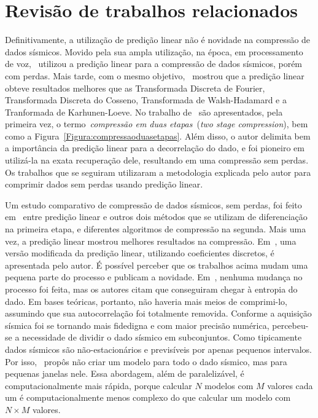 \section{Revisão de trabalhos relacionados}
\label{Sec:trabalhosrelacionados}

Definitivamente, a utilização de predição linear não é novidade na compressão de
dados sísmicos. Movido pela sua ampla utilização, na época, em
processamento de voz,~\citep{Artigo:bordley1983} utilizou a predição linear para a compressão de
dados sísmicos, porém com perdas. Mais tarde, com o
mesmo objetivo,~\citep{Artigo:linearmelhor} mostrou que a predição linear
obteve resultados melhores que as Transformada Discreta de Fourier, Transformada Discreta do Cosseno, Transformada de Walsh-Hadamard e a Tranformada
de Karhunen-Loeve. No trabalho de~\citep{Artigo:stearnsincompleto} são
apresentados, pela primeira vez, o termo~\emph{compressão em duas
etapas}~(\emph{two stage compression}), bem como a
Figura~\ref{Figura:compressaoduasetapas}. Além disso, o autor delimita bem a
importância da predição linear para a decorrelação do dado, e foi pioneiro em
utilizá-la na exata recuperação dele, resultando em uma compressão sem
perdas. Os trabalhos que se seguiram utilizaram a metodologia explicada pelo
autor para comprimir dados sem perdas usando predição linear.  

Um estudo comparativo de compressão de dados sísmicos, sem perdas, foi feito
em~\citep{Artigo:lpemaistres} entre predição linear e outros dois métodos que
se utilizam de diferenciação na primeira etapa, e diferentes algoritmos de
compressão na segunda. Mais uma vez, a predição linear mostrou melhores
resultados na compressão. Em~\citep{Article:twostagecompression}, uma versão
modificada da predição linear, utilizando coeficientes discretos, é apresentada
pelo autor. É possível perceber que os trabalhos acima mudam uma pequena parte
do processo e publicam a novidade. Em~\citep{Artigo:nenhumamudanca}, nenhuma
mudança no processo foi feita, mas os autores citam que conseguiram chegar à
entropia do dado. Em bases teóricas, portanto, não haveria mais meios de
comprimi-lo, assumindo que sua autocorrelação foi totalmente removida. Conforme
a aquisição sísmica foi se tornando mais fidedigna e com maior precisão
numérica, percebeu-se a necessidade de dividir o dado sísmico em subconjuntos.
Como tipicamente dados sísmicos são não-estacionários e previsíveis por apenas
pequenos intervalos. Por isso,~\citep{Artigo:lpjanela} propôs não criar um modelo para todo o dado
sísmico, mas para pequenas janelas nele. Essa abordagem, além de paralelizável, é
computacionalmente mais rápida, porque calcular $N$ modelos com $M$ valores cada
um é computacionalmente menos complexo do que calcular um modelo com $N\times M$ valores.

